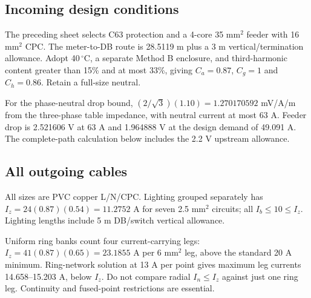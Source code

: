 \subsection*{Incoming design conditions}
The preceding sheet selects C63 protection and a 4-core 35 mm$^2$ feeder with 16 mm$^2$ CPC. The meter-to-DB route is 28.5119 m plus a 3 m vertical/termination allowance. Adopt 40\,$^\circ$C, a separate Method B enclosure, and third-harmonic content greater than 15\% and at most 33\%, giving $C_a=0.87$, $C_g=1$ and $C_h=0.86$. Retain a full-size neutral.

For the phase-neutral drop bound, $(2/\sqrt3)(1.10)=1.270170592$ mV/A/m from the three-phase table impedance, with neutral current at most 63 A. Feeder drop is 2.521606 V at 63 A and 1.964888 V at the design demand of 49.091 A. The complete-path calculation below includes the 2.2 V upstream allowance.

\subsection*{All outgoing cables}
All sizes are PVC copper L/N/CPC. Lighting grouped separately has $I_z=24(0.87)(0.54)=11.2752$ A for seven 2.5 mm$^2$ circuits;  all $I_b\le 10\le I_z$. Lighting lengths include 5 m DB/switch vertical allowance.

Uniform ring banks count four current-carrying legs: $I_z=41(0.87)(0.65)=23.1855$ A per 6 mm$^2$ leg, above the standard 20 A minimum. Ring-network solution at 13 A per point gives maximum leg currents 14.658--15.203 A, below $I_z$. Do not compare radial $I_n\le I_z$ against just one ring leg. Continuity and fused-point restrictions are essential.


